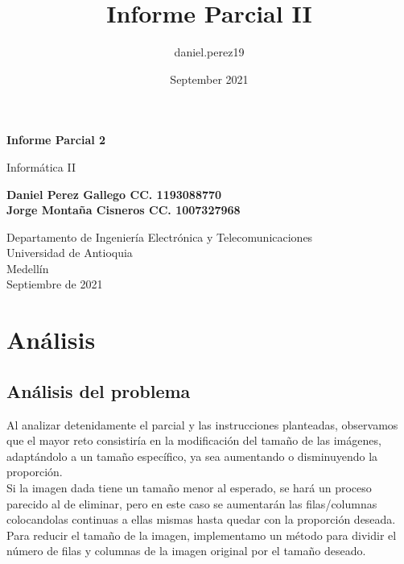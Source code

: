 \documentclass{article}
\title{Informe Parcial II}
\author{daniel.perez19 }
\date{September 2021}
\begin{document}
\begin{titlepage}
    \begin{center}
        \vspace*{1cm}
            
        \Huge
        \textbf{Informe Parcial 2}
            
        \vspace{0.5cm}
        \LARGE
        Informática II
            
        \vspace{1.5cm}
            
        \textbf{Daniel Perez Gallego CC. 1193088770\\Jorge Montaña Cisneros CC.  1007327968}
            
        \vfill
            
        \vspace{0.8cm}
            
        \Large
        Departamento de Ingeniería Electrónica y Telecomunicaciones\\
        Universidad de Antioquia\\
        Medellín\\
        Septiembre de 2021
            
    \end{center}
\end{titlepage}

\tableofcontents

\section{Análisis}
\subsection{Análisis del problema}
Al analizar detenidamente el parcial y las instrucciones planteadas, observamos que el mayor reto consistiría en la modificación del tamaño de las imágenes, adaptándolo a un tamaño específico, ya sea aumentando o disminuyendo la proporción.\\ 

Si la imagen dada tiene un tamaño menor al esperado, se hará un proceso parecido al de eliminar, pero en este caso se aumentarán las filas/columnas colocandolas continuas a ellas mismas  hasta quedar con la proporción deseada.\\

Para reducir el tamaño de la imagen, implementamo un método para dividir el número de filas y columnas de la imagen original por el tamaño deseado.
\end{document}
